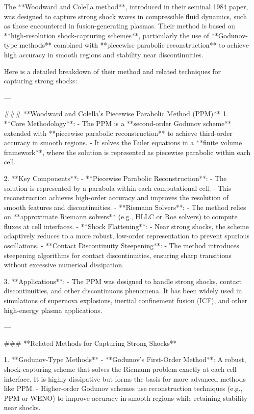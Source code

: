 The **Woodward and Colella method**, introduced in their seminal 1984 paper, was designed to capture strong shock waves in compressible fluid dynamics, such as those encountered in fusion-generating plasmas. Their method is based on **high-resolution shock-capturing schemes**, particularly the use of **Godunov-type methods** combined with **piecewise parabolic reconstruction** to achieve high accuracy in smooth regions and stability near discontinuities.

Here is a detailed breakdown of their method and related techniques for capturing strong shocks:

---

### **Woodward and Colella's Piecewise Parabolic Method (PPM)**
1. **Core Methodology**:
   - The PPM is a **second-order Godunov scheme** extended with **piecewise parabolic reconstruction** to achieve third-order accuracy in smooth regions.
   - It solves the Euler equations in a **finite volume framework**, where the solution is represented as piecewise parabolic within each cell.

2. **Key Components**:
   - **Piecewise Parabolic Reconstruction**:
     - The solution is represented by a parabola within each computational cell.
     - This reconstruction achieves high-order accuracy and improves the resolution of smooth features and discontinuities.
   - **Riemann Solvers**:
     - The method relies on **approximate Riemann solvers** (e.g., HLLC or Roe solvers) to compute fluxes at cell interfaces.
   - **Shock Flattening**:
     - Near strong shocks, the scheme adaptively reduces to a more robust, low-order representation to prevent spurious oscillations.
   - **Contact Discontinuity Steepening**:
     - The method introduces steepening algorithms for contact discontinuities, ensuring sharp transitions without excessive numerical dissipation.

3. **Applications**:
   - The PPM was designed to handle strong shocks, contact discontinuities, and other discontinuous phenomena. It has been widely used in simulations of supernova explosions, inertial confinement fusion (ICF), and other high-energy plasma applications.

---

### **Related Methods for Capturing Strong Shocks**

1. **Godunov-Type Methods**
   - **Godunov’s First-Order Method**: A robust, shock-capturing scheme that solves the Riemann problem exactly at each cell interface. It is highly dissipative but forms the basis for more advanced methods like PPM.
   - Higher-order Godunov schemes use reconstruction techniques (e.g., PPM or WENO) to improve accuracy in smooth regions while retaining stability near shocks.

